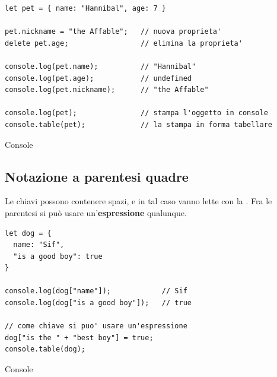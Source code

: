 \begin{affianco}[0.58][c]
\begin{lstlisting}[style=js, name=modifica.js]
let pet = { name: "Hannibal", age: 7 }

pet.nickname = "the Affable";   // nuova proprieta'
delete pet.age;                 // elimina la proprieta'

console.log(pet.name);          // "Hannibal"
console.log(pet.age);           // undefined
console.log(pet.nickname);      // "the Affable"

console.log(pet);               // stampa l'oggetto in console
console.table(pet);             // la stampa in forma tabellare
\end{lstlisting}
\risultato
\begin{immagine}
\end{immagine}
\begin{devtools}{Console}
\end{devtools}
\end{affianco}

\subsection{Notazione a parentesi quadre}

Le chiavi possono contenere spazi, e in tal caso vanno lette con la
. Fra le parentesi si può usare
un'\textbf{espressione} qualunque.

\begin{affianco}[0.52][c]
\begin{lstlisting}[style=js, name=quadre.js]
let dog = {
  name: "Sif",
  "is a good boy": true
}

console.log(dog["name"]);            // Sif
console.log(dog["is a good boy"]);   // true

// come chiave si puo' usare un'espressione
dog["is the " + "best boy"] = true;
console.table(dog);
\end{lstlisting}
\risultato
\begin{devtools}{Console}
\end{devtools}
\end{affianco}

